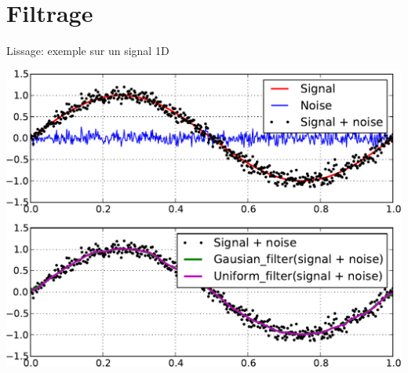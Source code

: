\documentclass[8pt,a4paper]{beamer}
\begin{document}
\section{Filtrage}

\begin{frame}[containsverbatim]{Lissage: exemple sur un signal 1D}
  \begin{center}
  \includegraphics[width=.6\textwidth]{figures/filters.pdf} 
  \end{center}  
  
\end{frame}  
\end{document}
